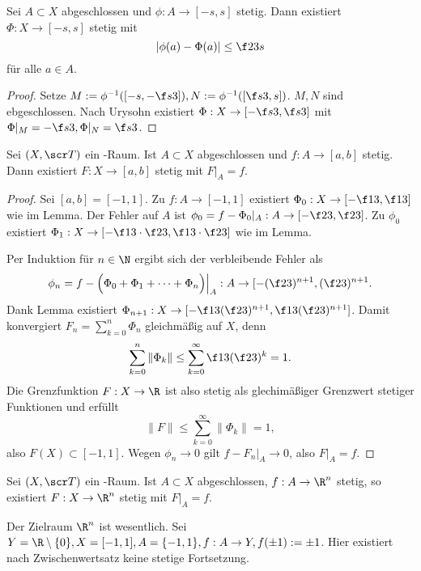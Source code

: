 \begin{lem}
	Sei $A \subset X$ abgeschlossen und $\phi: A \to [-s, s]$ stetig.
	Dann existiert $\Phi: X \to [-s, s]$ stetig mit
	\[
		|\phi(a) - \Phi(a)| \le \f 23 s
	\]
	für alle $a \in A$.
	\begin{proof}
		Setze $M := \phi^{-1}([-s, - \f s3]), N := \phi^{-1}([\f s3, s])$.
		$M, N$ sind ebgeschlossen.
		Nach Urysohn existiert $\Phi: X \to [-\f s3, \f s3]$ mit $\Phi|_M = - \f s3, \Phi|_N = \f s3$.
	\end{proof}
\end{lem}

\begin{st}[Tietze]
	Sei $(X, \scr T)$ ein -Raum.
	Ist $A \subset X$ abgeschlossen und $f: A \to [a,b]$ stetig.
	Dann existiert $F: X \to [a,b]$ stetig mit $F|_A = f$.
	\begin{proof}
		Sei \oBdA $[a,b] = [-1,1]$.
		Zu $f: A \to [-1,1]$ existiert $\Phi_0 : X \to [-\f 13, \f 13]$ wie im Lemma.
		Der Fehler auf $A$ ist $\phi_0 = f - \Phi_0|_A : A \to [-\f 23, \f 23]$.
		Zu $\phi_0$ existiert $\Phi_1: X \to [-\f 13 \cdot \f 23, \f 13 \cdot \f 23]$ wie im Lemma. %

		Per Induktion für $n \in \N$ ergibt sich der verbleibende Fehler als
		\[
			\phi_n = f - \Big( \Phi_0 + \Phi_1 + \dotsb + \Phi_n \Big)\Big|_A
			: A \to [-(\f 23)^{n+1}, (\f 23)^{n+1}.
		\]
		Dank Lemma existiert $\Phi_{n+1}: X \to [-\f 13(\f 23)^{n+1}, \f 13 (\f 23)^{n+1}]$.
		Damit konvergiert $F_n = \sum_{k=0}^n \Phi_n$ gleichmäßig auf $X$, denn
		\[
			\sum_{k=0}^n \|\Phi_k\|
			\le \sum_{k=0}^\infty \f 13 (\f 23)^k
			= 1.
		\]
		Die Grenzfunktion $F: X \to \R$ ist also stetig als glechimäßiger Grenzwert stetiger Funktionen und erfüllt
		\[
			\|F\| \le \sum_{k=0}^\infty \|\Phi_k\| = 1,
		\]
		also $F(X) \subset [-1, 1]$.
		Wegen $\phi_n \to 0$ gilt $f - F_n|_A \to 0$, also $F|_A = f$.
	\end{proof}
\end{st}

\begin{kor}
	Sei $(X, \scr T)$ ein -Raum.
	Ist $A \subset X$ abgeschlossen, $f: A \to \R^n$ stetig, so existiert $F: X \to \R^n$ stetig mit $F|_A = f$.
	\begin{note}
		Der Zielraum $\R^n$ ist wesentlich.
		Sei $Y = \R \setminus \{0\}, X = [-1,1], A = \{-1, 1\}, f: A \to Y, f(\pm 1) := \pm 1$.
		Hier existiert nach Zwischenwertsatz keine stetige Fortsetzung.
	\end{note}
\end{kor}

